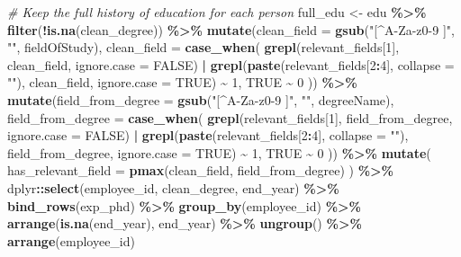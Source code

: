 \documentclass[11pt,]{article}
\newenvironment{Shaded}{\begin{snugshade}}{\end{snugshade}}
\newcommand{\AttributeTok}[1]{\textcolor[rgb]{0.13,0.29,0.53}{#1}}
\newcommand{\CommentTok}[1]{\textcolor[rgb]{0.56,0.35,0.01}{\textit{#1}}}
\newcommand{\ConstantTok}[1]{\textcolor[rgb]{0.56,0.35,0.01}{#1}}
\newcommand{\DecValTok}[1]{\textcolor[rgb]{0.00,0.00,0.81}{#1}}
\newcommand{\FunctionTok}[1]{\textcolor[rgb]{0.13,0.29,0.53}{\textbf{#1}}}
\newcommand{\NormalTok}[1]{#1}
\newcommand{\OtherTok}[1]{\textcolor[rgb]{0.56,0.35,0.01}{#1}}
\newcommand{\SpecialCharTok}[1]{\textcolor[rgb]{0.81,0.36,0.00}{\textbf{#1}}}
\newcommand{\StringTok}[1]{\textcolor[rgb]{0.31,0.60,0.02}{#1}}
\begin{document}
\begin{Shaded}
\begin{Highlighting}[]
\CommentTok{\# Keep the full history of education for each person}
\NormalTok{full\_edu }\OtherTok{\textless{}{-}}\NormalTok{ edu }\SpecialCharTok{\%\textgreater{}\%}
  \FunctionTok{filter}\NormalTok{(}\SpecialCharTok{!}\FunctionTok{is.na}\NormalTok{(clean\_degree)) }\SpecialCharTok{\%\textgreater{}\%}
  \FunctionTok{mutate}\NormalTok{(}\AttributeTok{clean\_field =} \FunctionTok{gsub}\NormalTok{(}\StringTok{"[\^{}A{-}Za{-}z0{-}9 ]"}\NormalTok{, }\StringTok{""}\NormalTok{, fieldOfStudy),}
         \AttributeTok{clean\_field =} \FunctionTok{case\_when}\NormalTok{(}
           \FunctionTok{grepl}\NormalTok{(relevant\_fields[}\DecValTok{1}\NormalTok{], clean\_field, }\AttributeTok{ignore.case =} \ConstantTok{FALSE}\NormalTok{) }\SpecialCharTok{|} 
             \FunctionTok{grepl}\NormalTok{(}\FunctionTok{paste}\NormalTok{(relevant\_fields[}\DecValTok{2}\SpecialCharTok{:}\DecValTok{4}\NormalTok{], }\AttributeTok{collapse =} \StringTok{""}\NormalTok{), }
\NormalTok{                   clean\_field, }\AttributeTok{ignore.case =} \ConstantTok{TRUE}\NormalTok{) }\SpecialCharTok{\textasciitilde{}} \DecValTok{1}\NormalTok{,}
           \ConstantTok{TRUE} \SpecialCharTok{\textasciitilde{}} \DecValTok{0}
\NormalTok{         )) }\SpecialCharTok{\%\textgreater{}\%} 
  \FunctionTok{mutate}\NormalTok{(}\AttributeTok{field\_from\_degree =} \FunctionTok{gsub}\NormalTok{(}\StringTok{"[\^{}A{-}Za{-}z0{-}9 ]"}\NormalTok{, }\StringTok{""}\NormalTok{, degreeName),}
         \AttributeTok{field\_from\_degree =} \FunctionTok{case\_when}\NormalTok{(}
           \FunctionTok{grepl}\NormalTok{(relevant\_fields[}\DecValTok{1}\NormalTok{], field\_from\_degree, }\AttributeTok{ignore.case =} \ConstantTok{FALSE}\NormalTok{) }\SpecialCharTok{|} 
             \FunctionTok{grepl}\NormalTok{(}\FunctionTok{paste}\NormalTok{(relevant\_fields[}\DecValTok{2}\SpecialCharTok{:}\DecValTok{4}\NormalTok{], }\AttributeTok{collapse =} \StringTok{""}\NormalTok{), }
\NormalTok{                   field\_from\_degree, }\AttributeTok{ignore.case =} \ConstantTok{TRUE}\NormalTok{) }\SpecialCharTok{\textasciitilde{}} \DecValTok{1}\NormalTok{,}
           \ConstantTok{TRUE} \SpecialCharTok{\textasciitilde{}} \DecValTok{0}
\NormalTok{         ))  }\SpecialCharTok{\%\textgreater{}\%} 
  \FunctionTok{mutate}\NormalTok{(}
    \AttributeTok{has\_relevant\_field =} \FunctionTok{pmax}\NormalTok{(clean\_field, field\_from\_degree)}
\NormalTok{  ) }\SpecialCharTok{\%\textgreater{}\%} 
\NormalTok{  dplyr}\SpecialCharTok{::}\FunctionTok{select}\NormalTok{(employee\_id, clean\_degree, end\_year) }\SpecialCharTok{\%\textgreater{}\%} 
  \FunctionTok{bind\_rows}\NormalTok{(exp\_phd) }\SpecialCharTok{\%\textgreater{}\%} 
  \FunctionTok{group\_by}\NormalTok{(employee\_id) }\SpecialCharTok{\%\textgreater{}\%}
  \FunctionTok{arrange}\NormalTok{(}\FunctionTok{is.na}\NormalTok{(end\_year), end\_year) }\SpecialCharTok{\%\textgreater{}\%}
  \FunctionTok{ungroup}\NormalTok{() }\SpecialCharTok{\%\textgreater{}\%}
  \FunctionTok{arrange}\NormalTok{(employee\_id)}


\end{Highlighting}
\end{Shaded}
\end{document}
